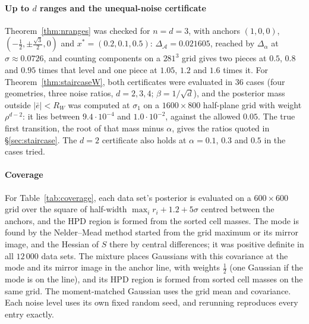 \paragraph{Up to $d$ ranges and the unequal-noise certificate} Theorem~\ref{thm:nranges} was checked for $n = d = 3$,
with anchors $(1, 0, 0)$, $(-\frac12, \pm\frac{\sqrt3}{2}, 0)$ and $x^* = (0.2, 0.1, 0.5)$: $\Delta_{\mathcal A} = 0.021605$,
reached by $\Delta_\alpha$ at $\sigma \approx 0.0726$, and counting components on a $281^3$ grid gives two pieces at
$0.5$, $0.8$ and $0.95$ times that level and one piece at $1.05$, $1.2$ and $1.6$ times it. For
Theorem~\ref{thm:staircaseW}, both certificates were evaluated in $36$ cases (four geometries, three noise ratios,
$d = 2, 3, 4$; $\beta = 1/\sqrt d$), and the posterior mass outside $|\bar e| < R_W$ was computed at $\sigma_1$ on a
$1600 \times 800$ half-plane grid with weight $\rho^{d-2}$: it lies between $9.4\cdot10^{-4}$ and $1.0\cdot10^{-2}$,
against the allowed $0.05$. The true first transition, the root of that mass minus $\alpha$, gives the ratios quoted
in \S\ref{sec:staircase}. The $d = 2$ certificate also holds at $\alpha = 0.1$, $0.3$ and $0.5$ in the cases tried.

\paragraph{Coverage} For Table~\ref{tab:coverage}, each data set's posterior is evaluated on a $600 \times 600$ grid over the
square of half-width $\max_i r_i + 1.2 + 5\sigma$ centred between the anchors, and the HPD region is formed from the
sorted cell masses. The mode is found by the Nelder--Mead method started from the grid maximum or its mirror image, and
the Hessian of $S$ there by central differences; it was positive definite in all $12\,000$ data sets. The mixture
places Gaussians with this covariance at the mode and its mirror image in the anchor line, with weights $\frac12$
(one Gaussian if the mode is on the line), and its HPD region is formed from sorted cell masses on the same grid. The moment-matched
Gaussian uses the grid mean and covariance. Each noise level uses its own fixed random seed, and rerunning reproduces
every entry exactly.
